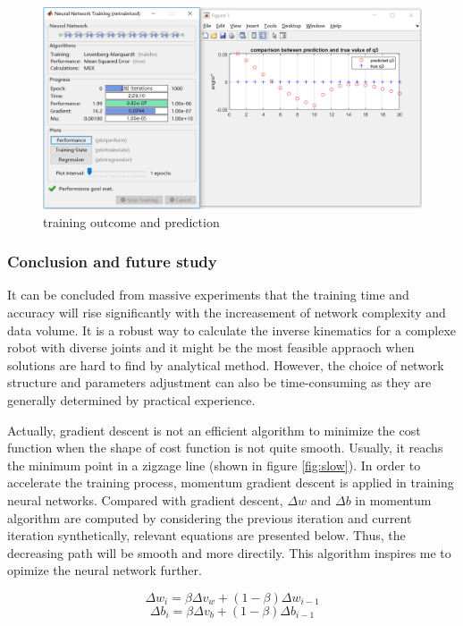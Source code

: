 \begin{figure}[htbp] 
\begin{center}
\includegraphics[width=\textwidth]{images/neural_network_outcome}
\caption{training outcome and prediction }
\label{fig:neural_network_outcome}
\end{center}
\end{figure}


\subsubsection{Conclusion and future study}
It can be concluded from massive experiments that the training time and accuracy will rise significantly with the increasement of network complexity and data volume. It is a robust way to calculate the inverse kinematics for a complexe robot with diverse joints and it might be the most feasible appraoch when solutions are hard to find by analytical method. However, the choice of network structure and parameters adjustment can also be time-consuming as they are generally determined by practical experience.

Actually, gradient descent is not an efficient algorithm to minimize the cost function when the shape of cost function is not quite smooth. Usually, it reachs the minimum point in a zigzage line (shown in figure  \ref{fig:slow}). In order to accelerate the training process, momentum gradient descent is applied in training neural networks. Compared with gradient descent, $\Delta w$ and $\Delta b$ in momentum algorithm are computed by considering the previous iteration and current iteration synthetically, relevant equations are presented below. Thus, the decreasing path will be smooth and more directily. This algorithm inspires me to opimize the neural network further.   

\begin{equation}
\Delta w_i = \beta \Delta v_w + (1-\beta)\Delta w_{i-1}
\end{equation}
\begin{equation}
\Delta b_i = \beta \Delta v_b + (1-\beta)\Delta b_{i-1}
\end{equation}

